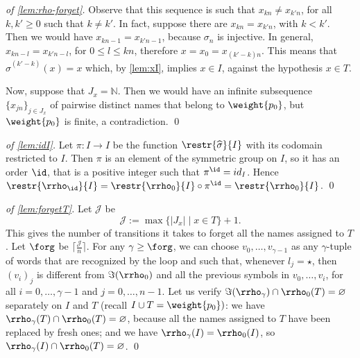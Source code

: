 \begin{proof}[of \cref{lem:rho-forget}]
Observe that this sequence is such that $x_{kn} \neq x_{k'n}$, for all $k,k' \geq 0$ such that $k \neq k'$. In fact, suppose there are $x_{kn} = x_{k'n}$, with $k < k'$. Then we would have $x_{kn-1} = x_{k'n-1}$, because $\sigma_{n}$ is injective. In general, $x_{kn-l} = x_{k'n-l}$, for $0 \leq l \leq kn$, therefore $x = x_0 = x_{(k'-k)n}$. This means that $\widehat{\sigma}^{(k'-k)}(x) = x$ which, by \cref{lem:xI}, implies $x \in I$, against the hypothesis $x \in T$.

Now, suppose that $J_x = \mathbb{N}$. Then we would have an infinite subsequence $\{x_{jn}\}_{j \in J_x}$ of pairwise distinct names that belong to $\weight{p_0}$, but $\weight{p_0}$ is finite, a contradiction.
\qed
\end{proof}


\begin{proof}[of \cref{lem:idI}]\hfill

\item Let $\pi \colon I \to I$ be the function $\restr{\widehat{\sigma}}{I}$ with its codomain restricted to $I$. Then $\pi$ is an element of the symmetric group on $I$, so it has an order $\id$, that is a positive integer such that $\pi^\id = id_I$. Hence $\restr{ \rrho_\id }{ I } =\restr{ \rrho_0 }{I} \circ \pi^\id = \restr{ \rrho_0 }{I}$.
\qed
\end{proof}

\begin{proof}[of \cref{lem:forgetT}]
Let $\mathcal{J}$ be
\[
	\mathcal{J} := \max \{ |J_x|\mid x \in T \} + 1 .
\]
This gives the number of transitions it takes to forget all the names assigned to $T$. Let $\forg$ be $\lceil \frac{\mathcal{J}}{n} \rceil$. For any $\gamma \geq \forg$, we can choose $v_0,\dots,v_{\gamma-1}$ as any $\gamma$-tuple of words that are recognized by the loop and such that, whenever $l_j = \star$, then $(v_i)_j$ is different from $\Im(\rrho_0)$ and all the previous symbols in $v_0,\dots,v_i$, for all $i=0,\dots,\gamma-1$ and $j=0,\dots,n-1$. Let us verify $\Im(\rrho_\gamma) \cap \rrho_0(T) = \varnothing$ separately on $I$ and $T$ (recall $I \cup T = \weight{p_0})$: we have $\rrho_\gamma(T) \cap \rrho_0(T) = \varnothing$, because all the names assigned to $T$ have been replaced by fresh ones; and we have $\rrho_\gamma(I) = \rrho_0(I)$, so $\rrho_\gamma(I) \cap \rrho_0(T) = \varnothing$.
\qed
\end{proof}


